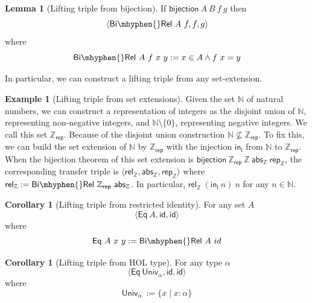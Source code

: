 \documentclass[]{article}
\theoremstyle{definition}
\newtheorem{lemma}[theorem]{Lemma}
\newtheorem{corollary}[theorem]{Corollary}
\newtheorem{example}{Example}[section]
\newcommand{\eq}{\mathsf{Eq}}
\newcommand{\id}{\mathsf{id}}
\newcommand{\bijection}{\mathsf{bijection}}
\newcommand{\birel}{\mathsf{Bi\mhyphen{}Rel}}
\newcommand{\univ}{\mathsf{Univ}}
\newcommand{\nat}{\mathbb{N}}
\newcommand{\inte}{\mathbb{Z}}
\newcommand{\abs}{\mathsf{abs}}
\newcommand{\rep}{\mathsf{rep}}
\newcommand{\relint}{\mathsf{rel_\inte}}
\begin{document}
\begin{lemma}[Lifting triple from bijection]
	If \(\bijection\ A\ B\ f\ g \) then
	\begin{equation}
		\langle \birel\ A\ f, f, g \rangle
	\end{equation}
	where
	\begin{equation}
		\birel\ A\ f\ x\ y := x \in A \land f\ x = y
	\end{equation}
\end{lemma}

In particular, we can construct a lifting triple from any set-extension.

\begin{example}[Lifting triple from set extensions]\label{lifting-int}
	Given the set \(\nat\) of natural numbers, we can construct a representation of integers as the disjoint union of \(\nat\), representing non-negative integers, and \(\nat \setminus \{0\}\), representing negative integers. We call this set \(\inte_{\rep}\). Because of the disjoint union construction \(\nat \nsubseteq \inte_{\rep}\). To fix this, we can build the set extension of \(\nat\) by \(\inte_{\rep}\) with the injection \(\mathsf{in_l}\) from \(\nat\) to \(\inte_{\rep}\). When the bijection theorem of this set extension is \(\bijection\ \inte_{\rep}\ \inte\ \abs_\inte\ \rep_\inte\), the corresponding transfer triple is \(\langle \relint, \abs_\inte, \rep_\inte \rangle\) where \(\relint := \birel\ \inte_{\rep}\ \abs_\inte\). In particular, \(\relint\ (\mathsf{in_l}\ n)\ n\) for any \(n \in \nat\).
\end{example}

\begin{corollary}[Lifting triple from restricted identity]
	For any set \(A\)
	\begin{equation}
		\langle \eq\ A, \id, \id \rangle
	\end{equation}
	where
	\begin{equation}
		\eq\ A\ x\ y := \birel\ A\ id
	\end{equation}
\end{corollary}

\begin{corollary}[Lifting triple from HOL type]
	For any type \(\alpha\)
	\begin{equation}
		\langle \eq\ \univ_\alpha, \id, \id \rangle
	\end{equation}
	where
	\begin{equation}
		\univ_\alpha\ := \{x \mid x : \alpha\}
	\end{equation}
\end{corollary}
\end{document}
